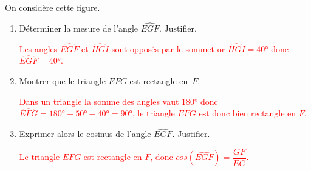     On considère cette figure.

    \begin{center}
    \end{center}
    \begin{enumerate}
        \item Déterminer la mesure de l'angle $\widehat{EGF}$. Justifier.

        \textcolor{red}{Les angles $\widehat{EGF}$ et $\widehat{HGI}$ sont opposés par le sommet or $\widehat{HGI}=\ang{40}$ donc $\widehat{EGF}=\ang{40}$.}
        \item Montrer que le triangle $EFG$ est rectangle \mbox{en $F$}.

        \textcolor{red}{Dans un triangle la somme des angles vaut \ang{180} donc $\widehat{EFG}=\ang{180}-\ang{50}-\ang{40}=\ang{90}$, le triangle $EFG$ est donc bien rectangle en $F$.}
        \item Exprimer alors le cosinus de l'angle $\widehat{EGF}$. Justifier.

        \textcolor{red}{Le triangle $EFG$ est rectangle en $F$, donc $cos(\widehat{EGF})=\dfrac{GF}{EG}$.}
    \end{enumerate}
